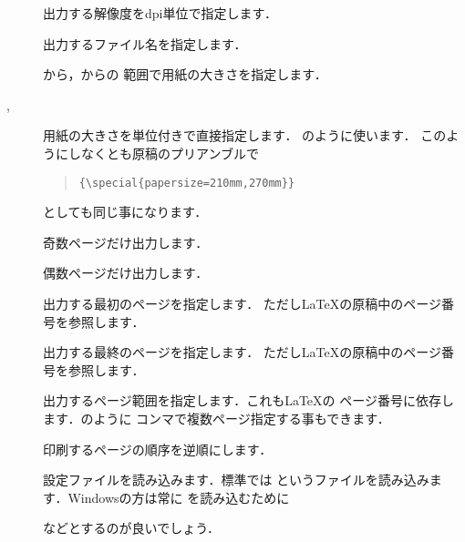 \begin{description}
\item[ ] 
   出力する解像度をdpi単位で指定します．
\item[ ]  
   出力するファイル名を指定します．
\item[ ] 
   から，からの
  範囲で用紙の大きさを指定します．
\item[ ,] 
   用紙の大きさを単位付きで直接指定します．
   \qu{\copt{21cm,27cm}}のように使います．
   このようにしなくとも原稿のプリアンブルで
   \begin{quote}
    \verb|{\special{papersize=210mm,270mm}}|
   \end{quote}
   としても同じ事になります．
\item[] 
	   奇数ページだけ出力します．
\item[] 
	   偶数ページだけ出力します．
\item[ ]
   出力する最初のページを指定します．
   ただし{\LaTeX}の原稿中のページ番号を参照します．
\item[ ] 
   出力する最終のページを指定します．
   ただし{\LaTeX}の原稿中のページ番号を参照します．
\item[ ]
   出力するページ範囲を指定します．これも{\LaTeX}の
   ページ番号に依存します．のように
   コンマで複数ページ指定する事もできます．
\item[]
   印刷するページの順序を逆順にします．
\item[ ] 
   設定ファイルを読み込みます．標準では
   というファイルを読み込みます．Windowsの方は常に
を読み込むために
\begin{InTerm}
\end{InTerm}
などとするのが良いでしょう．
\end{description}
%

